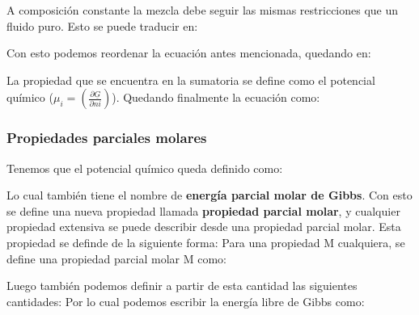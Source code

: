 A composición constante la mezcla debe seguir las mismas restricciones que un fluido puro. Esto se puede traducir en:

Con esto podemos reordenar la ecuación antes mencionada, quedando en:

La propiedad que se encuentra en la sumatoria se define como el potencial químico ($\mu_i=\left( \frac{\partial \underline{G}}{\partial ni} \right)$). Quedando finalmente la ecuación como:


\subsubsection{Propiedades parciales molares}

Tenemos que el potencial químico queda definido como:

Lo cual también tiene el nombre de \textbf{energía parcial molar de Gibbs}. Con esto se define una nueva propiedad llamada \textbf{propiedad parcial molar}, y cualquier propiedad extensiva se puede describir desde una propiedad parcial molar.
Esta propiedad se definde de la siguiente forma: Para una propiedad M cualquiera, se define una propiedad parcial molar M como:


Luego también podemos definir a partir de esta cantidad las siguientes cantidades:
Por lo cual podemos escribir la energía libre de Gibbs como:


